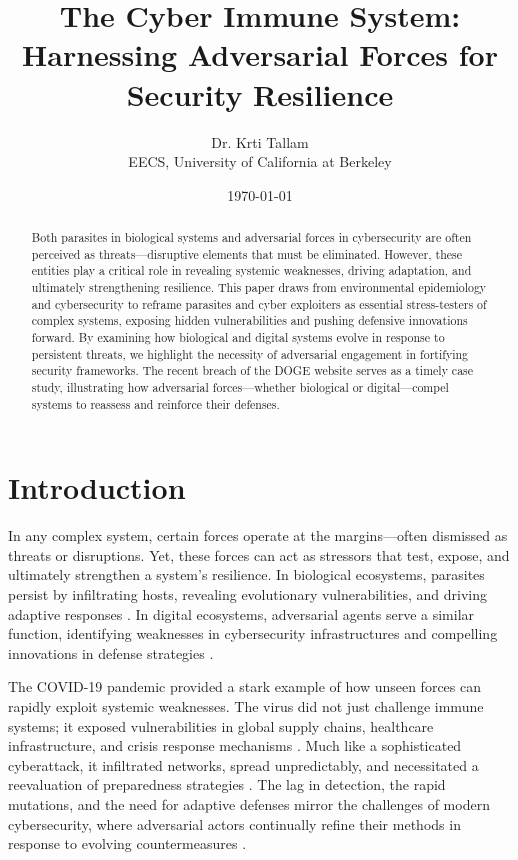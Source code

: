 \documentclass{article}
\title{The Cyber Immune System: Harnessing Adversarial Forces for Security Resilience}
\author{
  Dr. Krti Tallam \\
  EECS, University of California at Berkeley \\}
\date{\today}
\begin{document}
\maketitle

\begin{abstract}
Both parasites in biological systems and adversarial forces in cybersecurity are often perceived as threats—disruptive elements that must be eliminated. However, these entities play a critical role in revealing systemic weaknesses, driving adaptation, and ultimately strengthening resilience. This paper draws from environmental epidemiology and cybersecurity to reframe parasites and cyber exploiters as essential stress-testers of complex systems, exposing hidden vulnerabilities and pushing defensive innovations forward. By examining how biological and digital systems evolve in response to persistent threats, we highlight the necessity of adversarial engagement in fortifying security frameworks. The recent breach of the DOGE website serves as a timely case study, illustrating how adversarial forces—whether biological or digital—compel systems to reassess and reinforce their defenses.
\end{abstract}

\section{Introduction}
In any complex system, certain forces operate at the margins—often dismissed as threats or disruptions. Yet, these forces can act as stressors that test, expose, and ultimately strengthen a system’s resilience. In biological ecosystems, parasites persist by infiltrating hosts, revealing evolutionary vulnerabilities, and driving adaptive responses \citep{dobson1989population, anderson1991infectious}. In digital ecosystems, adversarial agents serve a similar function, identifying weaknesses in cybersecurity infrastructures and compelling innovations in defense strategies \citep{schneier2000secrets, mitnick2003art}. 

The COVID-19 pandemic provided a stark example of how unseen forces can rapidly exploit systemic weaknesses. The virus did not just challenge immune systems; it exposed vulnerabilities in global supply chains, healthcare infrastructure, and crisis response mechanisms \citep{lakner2021measuring, hsiang2020effect}. Much like a sophisticated cyberattack, it infiltrated networks, spread unpredictably, and necessitated a reevaluation of preparedness strategies \citep{lu2020artificial, chang2020covid}. The lag in detection, the rapid mutations, and the need for adaptive defenses mirror the challenges of modern cybersecurity, where adversarial actors continually refine their methods in response to evolving countermeasures \citep{biggio2018wild}. 
\end{document}
